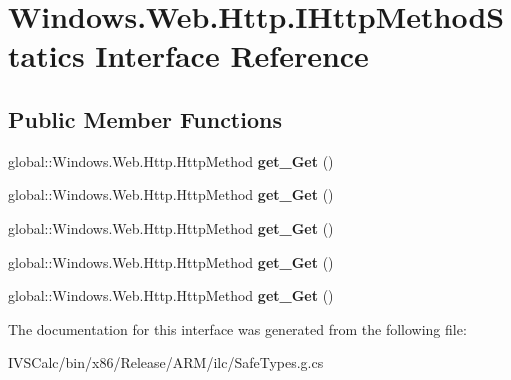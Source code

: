 \hypertarget{interface_windows_1_1_web_1_1_http_1_1_i_http_method_statics}{}\section{Windows.\+Web.\+Http.\+I\+Http\+Method\+Statics Interface Reference}
\label{interface_windows_1_1_web_1_1_http_1_1_i_http_method_statics}
\subsection*{Public Member Functions}
\begin{DoxyCompactItemize}
\item 
\mbox{\label{interface_windows_1_1_web_1_1_http_1_1_i_http_method_statics_aa8a4c227d48db7c939c4edd8a4b62922}} 
global\+::\+Windows.\+Web.\+Http.\+Http\+Method {\bfseries get\+\_\+\+Get} ()
\item 
\mbox{\label{interface_windows_1_1_web_1_1_http_1_1_i_http_method_statics_aa8a4c227d48db7c939c4edd8a4b62922}} 
global\+::\+Windows.\+Web.\+Http.\+Http\+Method {\bfseries get\+\_\+\+Get} ()
\item 
\mbox{\label{interface_windows_1_1_web_1_1_http_1_1_i_http_method_statics_aa8a4c227d48db7c939c4edd8a4b62922}} 
global\+::\+Windows.\+Web.\+Http.\+Http\+Method {\bfseries get\+\_\+\+Get} ()
\item 
\mbox{\label{interface_windows_1_1_web_1_1_http_1_1_i_http_method_statics_aa8a4c227d48db7c939c4edd8a4b62922}} 
global\+::\+Windows.\+Web.\+Http.\+Http\+Method {\bfseries get\+\_\+\+Get} ()
\item 
\mbox{\label{interface_windows_1_1_web_1_1_http_1_1_i_http_method_statics_aa8a4c227d48db7c939c4edd8a4b62922}} 
global\+::\+Windows.\+Web.\+Http.\+Http\+Method {\bfseries get\+\_\+\+Get} ()
\end{DoxyCompactItemize}


The documentation for this interface was generated from the following file\+:\begin{DoxyCompactItemize}
\item 
I\+V\+S\+Calc/bin/x86/\+Release/\+A\+R\+M/ilc/Safe\+Types.\+g.\+cs\end{DoxyCompactItemize}
